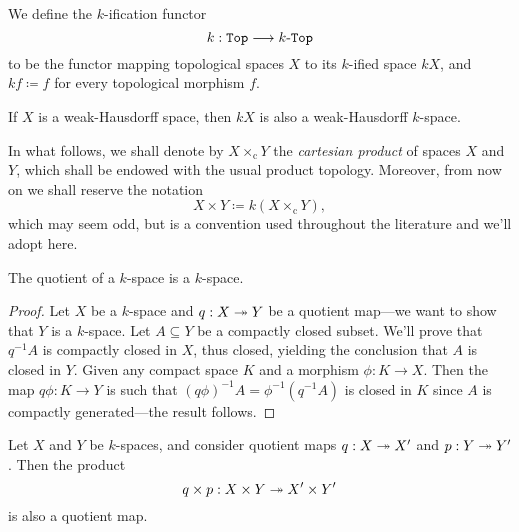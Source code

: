 \begin{definition}
\label{def:k-ification-functor}
We define the \(k\)-ification functor
\[
k: {\texttt{Top}} \longrightarrow {k\text{-}\texttt{Top}}
\]
to be the functor mapping topological spaces \(X\) to its \(k\)-ified space
\(k X\), and \(k f \coloneq f\) for every topological morphism \(f\).
\end{definition}

\begin{lemma}
\label{lem:weak-hausdorff-into-compactly-generated-space}
If \(X\) is a weak-Hausdorff space, then \(kX\) is also a weak-Hausdorff
\(k\)-space.
\end{lemma}

\begin{notation}[Products]
\label{not:cartesian-and-k-products}
In what follows, we shall denote by \(X \times_{\text{c}} Y\) the
\emph{cartesian product} of spaces \(X\) and \(Y\), which shall be endowed with
the usual product topology. Moreover, from now on we shall reserve the notation
\[
X \times Y \coloneq k(X \times_{\text{c}} Y),
\]
which may seem odd, but is a convention used throughout the literature and we'll
adopt here.
\end{notation}

\begin{proposition}[Quotients]
\label{prop:quotient-k-space-is-k-space}
The quotient of a \(k\)-space is a \(k\)-space.
\end{proposition}

\begin{proof}
Let \(X\) be a \(k\)-space and \(q: X \twoheadrightarrow Y\) be a quotient map---we want to
show that \(Y\) is a \(k\)-space. Let \(A \subseteq Y\) be a compactly closed
subset. We'll prove that \(q^{-1} A\) is compactly closed in \(X\), thus closed,
yielding the conclusion that \(A\) is closed in \(Y\). Given any compact space
\(K\) and a morphism \(\phi: K \to X\). Then the map \(q \phi: K \to Y\) is such
that \((q \phi)^{-1} A = \phi^{-1}(q^{-1} A)\) is closed in \(K\) since \(A\) is
compactly generated---the result follows.
\end{proof}

\begin{proposition}
\label{prop:k-space-product-of-quotient-maps-is-quotient-map}
Let \(X\) and \(Y\) be \(k\)-spaces, and consider quotient maps \(q: X \twoheadrightarrow X'\)
and \(p: Y \twoheadrightarrow Y'\). Then the product
\[
q \times p: X \times Y \twoheadrightarrow X' \times Y'
\]
is also a quotient map.
\end{proposition}

